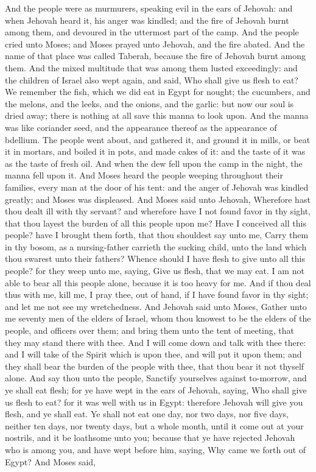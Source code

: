 And the people were as murmurers, speaking evil in the ears of Jehovah: and when Jehovah heard it, his anger was kindled; and the fire of Jehovah burnt among them, and devoured in the uttermost part of the camp. And the people cried unto Moses; and Moses prayed unto Jehovah, and the fire abated. And the name of that place was called Taberah, because the fire of Jehovah burnt among them.  And the mixed multitude that was among them lusted exceedingly: and the children of Israel also wept again, and said, Who shall give us flesh to eat? We remember the fish, which we did eat in Egypt for nought; the cucumbers, and the melons, and the leeks, and the onions, and the garlic: but now our soul is dried away; there is nothing at all save this manna to look upon. And the manna was like coriander seed, and the appearance thereof as the appearance of bdellium. The people went about, and gathered it, and ground it in mills, or beat it in mortars, and boiled it in pots, and made cakes of it: and the taste of it was as the taste of fresh oil. And when the dew fell upon the camp in the night, the manna fell upon it.  And Moses heard the people weeping throughout their families, every man at the door of his tent: and the anger of Jehovah was kindled greatly; and Moses was displeased. And Moses said unto Jehovah, Wherefore hast thou dealt ill with thy servant? and wherefore have I not found favor in thy sight, that thou layest the burden of all this people upon me? Have I conceived all this people? have I brought them forth, that thou shouldest say unto me, Carry them in thy bosom, as a nursing-father carrieth the sucking child, unto the land which thou swarest unto their fathers? Whence should I have flesh to give unto all this people? for they weep unto me, saying, Give us flesh, that we may eat. I am not able to bear all this people alone, because it is too heavy for me. And if thou deal thus with me, kill me, I pray thee, out of hand, if I have found favor in thy sight; and let me not see my wretchedness.  And Jehovah said unto Moses, Gather unto me seventy men of the elders of Israel, whom thou knowest to be the elders of the people, and officers over them; and bring them unto the tent of meeting, that they may stand there with thee. And I will come down and talk with thee there: and I will take of the Spirit which is upon thee, and will put it upon them; and they shall bear the burden of the people with thee, that thou bear it not thyself alone. And say thou unto the people, Sanctify yourselves against to-morrow, and ye shall eat flesh; for ye have wept in the ears of Jehovah, saying, Who shall give us flesh to eat? for it was well with us in Egypt: therefore Jehovah will give you flesh, and ye shall eat. Ye shall not eat one day, nor two days, nor five days, neither ten days, nor twenty days, but a whole month, until it come out at your nostrils, and it be loathsome unto you; because that ye have rejected Jehovah who is among you, and have wept before him, saying, Why came we forth out of Egypt? And Moses said, 